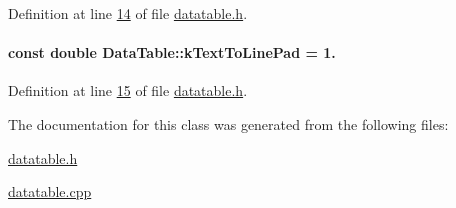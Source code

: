 Definition at line \hyperlink{datatable_8h_source_l00014}{14} of file \hyperlink{datatable_8h_source}{datatable.\+h}.

\hypertarget{class_data_table_ab0703eeee2cf6e45fc74356432434ac6}{}
\paragraph[{k\+Text\+To\+Line\+Pad}]{\setlength{\rightskip}{0pt plus 5cm}const double Data\+Table\+::k\+Text\+To\+Line\+Pad = 1.\hspace{0.3cm}{\ttfamily [static]}}\label{class_data_table_ab0703eeee2cf6e45fc74356432434ac6}


Definition at line \hyperlink{datatable_8h_source_l00015}{15} of file \hyperlink{datatable_8h_source}{datatable.\+h}.



The documentation for this class was generated from the following files\+:\begin{DoxyCompactItemize}
\item 
\hyperlink{datatable_8h}{datatable.\+h}\item 
\hyperlink{datatable_8cpp}{datatable.\+cpp}\end{DoxyCompactItemize}

